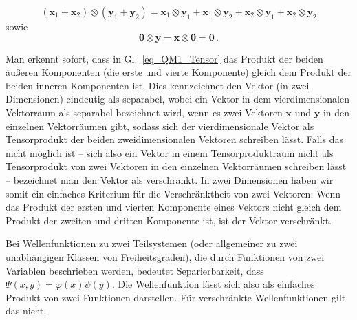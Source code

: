 \begin{equation}
     (\pmb{x}_1 + \pmb{x}_2) \otimes (\pmb{y}_1 + \pmb{y}_2) = \pmb{x}_1  \otimes \pmb{y}_1 +
     \pmb{x}_1  \otimes \pmb{y}_2 +\pmb{x}_2  \otimes \pmb{y}_1 +\pmb{x}_2  \otimes \pmb{y}_2 
\end{equation}
sowie
\begin{equation}
     \pmb{0} \otimes \pmb{y} = \pmb{x} \otimes \pmb{0} = \pmb{0} \, .
\end{equation}

Man erkennt sofort, dass in Gl.\ \ref{eq_QM1_Tensor} das Produkt der beiden \"au\ss eren Komponenten 
(die erste und vierte Komponente) gleich dem 
Produkt der beiden inneren Komponenten ist. 
Dies kennzeichnet den Vektor (in zwei Dimensionen) eindeutig
als separabel, wobei ein Vektor in dem vierdimensionalen Vektorraum als separabel bezeichnet wird, wenn
es zwei Vektoren $\pmb{x}$ und $\pmb{y}$ in den einzelnen Vektorr\"aumen gibt, sodass sich der
vierdimensionale Vektor als Tensorprodukt der beiden zweidimensionalen Vektoren schreiben l\"asst. 
Falls das nicht m\"oglich ist -- sich also ein Vektor in einem Tensorproduktraum nicht als Tensorprodukt
von zwei Vektoren in den einzelnen Vektorr\"aumen schreiben l\"asst -- bezeichnet man den Vektor
als verschr\"ankt. In zwei Dimensionen haben wir somit ein einfaches Kriterium f\"ur die Verschr\"anktheit
von zwei Vektoren: Wenn das Produkt der ersten und vierten Komponente eines Vektors nicht gleich dem
Produkt der zweiten und dritten Komponente ist, ist der Vektor verschr\"ankt. 

Bei Wellenfunktionen zu zwei Teilsystemen (oder allgemeiner zu zwei unabh\"angigen Klassen von
Freiheitsgraden), die durch Funktionen von zwei Variablen beschrieben werden, bedeutet Separierbarkeit,
dass $\Psi(x,y)= \varphi(x) \psi(y)$. Die Wellenfunktion l\"asst sich also als einfaches Produkt von zwei
Funktionen darstellen. F\"ur verschr\"ankte Wellenfunktionen gilt das nicht. 

